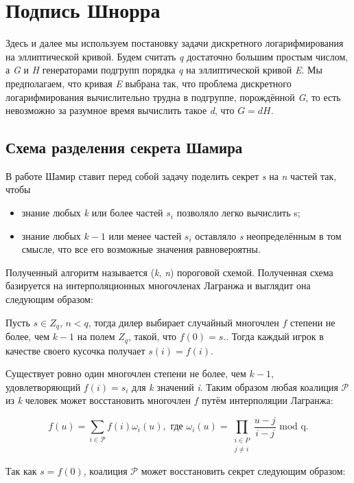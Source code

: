 \chapter{Подпись Шнорра}

Здесь и далее мы используем постановку задачи дискретного логарифмирования на эллиптической кривой. Будем считать \textit{q} достаточно большим простым числом, а \textit{G} и \textit{H} генераторами подгрупп порядка \textit{q} на эллиптической кривой \textit{E}. Мы предполагаем, что кривая \textit{E} выбрана так, что проблема дискретного логарифмирования вычислительно трудна в подгруппе, порождённой \textit{G}, то есть невозможно за разумное время вычислить такое \textit{d}, что $G = dH$.  

\section{Схема разделения секрета Шамира}

В работе \cite{KG} Шамир ставит перед собой задачу поделить секрет \textit{s} на \textit{n} частей так, чтобы 
\begin{itemize}
    \item знание любых \textit{k} или более частей $s_i$ позволяло легко вычислить s;
    \item знание любых $k-1$ или менее частей $s_i$ оставляло \textit{s} неопределённым в том смысле, что все его возможные значения равновероятны.
\end{itemize}

Полученный алгоритм называется (\textit{k}, \textit{n}) пороговой схемой. Полученная схема базируется на интерполяционных многочленах Лагранжа и выглядит она следующим образом:

Пусть $s \in Z_q$, $n < q$, тогда дилер выбирает случайный многочлен $f$ степени не более, чем $k-1$ на полем $Z_q$, такой, что $f(0) = s.$. Тогда каждый игрок в качестве своего кусочка получает $s(i) = f(i)$.  

Существует ровно один многочлен степени не более, чем $k - 1$, удовлетворяющий $f(i) = s_i$ для \textit{k} значений \textit{i}. Таким образом любая коалиция $\mathcal{P}$ из \textit{k} человек может восстановить многочлен $f$ путём интерполяции Лагранжа:

$$ f(u) = \sum_{i \in \mathcal{P}}f(i)\omega_i(u), \text{ где } \omega_i(u) = \prod_{\substack{i \in P \\ j \neq i}} \frac{u - j}{i - j} \text{ mod q.} $$

Так как $s = f(0)$, коалиция $\mathcal{P}$ может восстановить секрет следующим образом:

